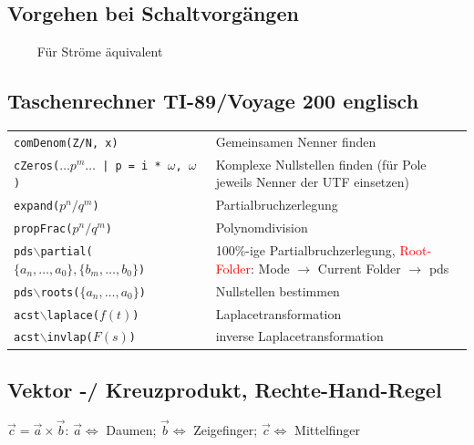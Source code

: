 	\subsection{Vorgehen bei Schaltvorgängen}
		 $\qquad$ Für Ströme äquivalent
		 
		 \subsection{Taschenrechner TI-89/Voyage 200 englisch}
		 	\begin{tabular}{p{6cm} p{12cm}}
				 \texttt{comDenom(Z/N, x)} & Gemeinsamen Nenner finden \\
				 \texttt{cZeros($\ldots p^m \ldots$ | p = i * $\omega$, $\omega$)} &
				 Komplexe Nullstellen finden (für Pole jeweils Nenner der UTF einsetzen) \\
				 \texttt{expand($p^n/q^m$)} & Partialbruchzerlegung \\
				 \texttt{propFrac($p^n/q^m$)} & Polynomdivision \\
				 \texttt{pds$\backslash$partial($\{a_n, \ldots, a_0\},\{b_m, \ldots, b_0\}$)} & 100\%-ige
				 Partialbruchzerlegung, \textcolor{red}{Root-Folder}: Mode
				 $\rightarrow$ Current Folder $\rightarrow$ pds \\ 
				 \texttt{pds$\backslash$roots($\{a_n, \ldots, a_0\}$)} & Nullstellen
				 bestimmen \\ \texttt{acst$\backslash$laplace($f(t)$)} & Laplacetransformation \\
				 \texttt{acst$\backslash$invlap($F(s)$)} & inverse Laplacetransformation   
			\end{tabular}
		 
		 
	\subsection{Vektor -/ Kreuzprodukt, Rechte-Hand-Regel}
	$\vec{c} = \vec{a} \times \vec{b}$: \qquad $\vec{a} \Leftrightarrow$ Daumen;
	$\vec{b} \Leftrightarrow$ Zeigefinger; $\vec{c} \Leftrightarrow$ Mittelfinger
	 
